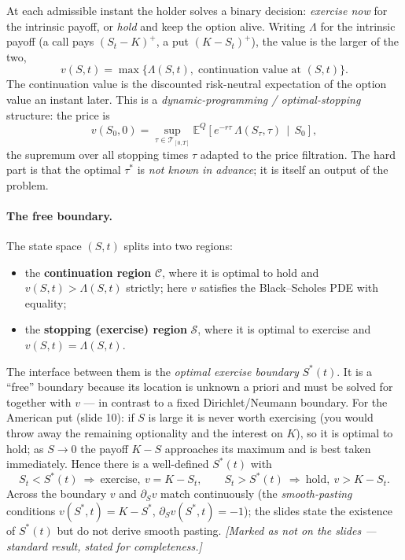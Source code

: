 \documentclass[11pt]{article}
\newcommand{\E}{\mathbb{E}}
\begin{document}
At each admissible instant the holder solves a binary decision: \emph{exercise now} for the intrinsic payoff,
or \emph{hold} and keep the option alive. Writing $\Lambda$ for the intrinsic payoff (a call pays
$(S_t-K)^+$, a put $(K-S_t)^+$), the value is the larger of the two,
\begin{equation}\label{eq:bellman}
v(S,t)=\max\big\{\Lambda(S,t),\;\text{continuation value at }(S,t)\big\}.
\end{equation}
The continuation value is the discounted risk-neutral expectation of the option value an instant later. This
is a \emph{dynamic-programming / optimal-stopping} structure: the price is
\begin{equation}\label{eq:optstop}
v(S_0,0)=\sup_{\tau\in\mathcal T_{[0,T]}} \E^{Q}\!\left[e^{-r\tau}\,\Lambda(S_\tau,\tau)\,\middle|\,S_0\right],
\end{equation}
the supremum over all stopping times $\tau$ adapted to the price filtration. The hard part is that the optimal
$\tau^\ast$ is \emph{not known in advance}; it is itself an output of the problem.

\paragraph{The free boundary.} The state space $(S,t)$ splits into two regions:
\begin{itemize}[leftmargin=*]
  \item the \textbf{continuation region} $\mathcal C$, where it is optimal to hold and $v(S,t)>\Lambda(S,t)$
  strictly; here $v$ satisfies the Black--Scholes PDE with equality;
  \item the \textbf{stopping (exercise) region} $\mathcal S$, where it is optimal to exercise and
  $v(S,t)=\Lambda(S,t)$.
\end{itemize}
The interface between them is the \emph{optimal exercise boundary} $S^\ast(t)$. It is a ``free'' boundary
because its location is unknown a priori and must be solved for together with $v$ --- in contrast to a fixed
Dirichlet/Neumann boundary. For the American put (slide 10): if $S$ is large it is never worth exercising (you
would throw away the remaining optionality and the interest on $K$), so it is optimal to hold; as $S\to0$ the
payoff $K-S$ approaches its maximum and is best taken immediately. Hence there is a well-defined $S^\ast(t)$
with
\begin{equation}
S_t<S^\ast(t)\ \Rightarrow\ \text{exercise},\ v=K-S_t,
\qquad
S_t>S^\ast(t)\ \Rightarrow\ \text{hold},\ v>K-S_t .
\end{equation}
Across the boundary $v$ and $\partial_S v$ match continuously (the \emph{smooth-pasting} conditions
$v(S^\ast,t)=K-S^\ast$, $\partial_S v(S^\ast,t)=-1$); the slides state the existence of $S^\ast(t)$ but do not
derive smooth pasting. \emph{[Marked as not on the slides --- standard result, stated for completeness.]}
\end{document}
